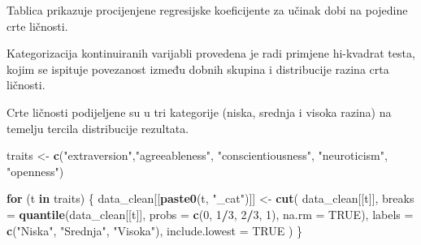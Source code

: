 \documentclass[
]{article}
\newenvironment{Shaded}{\begin{snugshade}}{\end{snugshade}}
\newcommand{\AttributeTok}[1]{\textcolor[rgb]{0.13,0.29,0.53}{#1}}
\newcommand{\ConstantTok}[1]{\textcolor[rgb]{0.56,0.35,0.01}{#1}}
\newcommand{\ControlFlowTok}[1]{\textcolor[rgb]{0.13,0.29,0.53}{\textbf{#1}}}
\newcommand{\DecValTok}[1]{\textcolor[rgb]{0.00,0.00,0.81}{#1}}
\newcommand{\FunctionTok}[1]{\textcolor[rgb]{0.13,0.29,0.53}{\textbf{#1}}}
\newcommand{\NormalTok}[1]{#1}
\newcommand{\OtherTok}[1]{\textcolor[rgb]{0.56,0.35,0.01}{#1}}
\newcommand{\SpecialCharTok}[1]{\textcolor[rgb]{0.81,0.36,0.00}{\textbf{#1}}}
\newcommand{\StringTok}[1]{\textcolor[rgb]{0.31,0.60,0.02}{#1}}
\begin{document}
Tablica prikazuje procijenjene regresijske koeficijente za učinak dobi
na pojedine crte ličnosti.

Kategorizacija kontinuiranih varijabli provedena je radi primjene
hi-kvadrat testa, kojim se ispituje povezanost između dobnih skupina i
distribucije razina crta ličnosti.

\begin{Shaded}
\end{Shaded}

Crte ličnosti podijeljene su u tri kategorije (niska, srednja i visoka
razina) na temelju tercila distribucije rezultata.

\begin{Shaded}
\begin{Highlighting}[]
\NormalTok{traits }\OtherTok{\textless{}{-}} \FunctionTok{c}\NormalTok{(}\StringTok{"extraversion"}\NormalTok{,}\StringTok{"agreeableness"}\NormalTok{, }\StringTok{"conscientiousness"}\NormalTok{, }\StringTok{"neuroticism"}\NormalTok{, }\StringTok{"openness"}\NormalTok{)}

\ControlFlowTok{for}\NormalTok{ (t }\ControlFlowTok{in}\NormalTok{ traits) \{}
\NormalTok{  data\_clean[[}\FunctionTok{paste0}\NormalTok{(t, }\StringTok{"\_cat"}\NormalTok{)]] }\OtherTok{\textless{}{-}} \FunctionTok{cut}\NormalTok{(}
\NormalTok{    data\_clean[[t]],}
    \AttributeTok{breaks =} \FunctionTok{quantile}\NormalTok{(data\_clean[[t]], }\AttributeTok{probs =} \FunctionTok{c}\NormalTok{(}\DecValTok{0}\NormalTok{, }\DecValTok{1}\SpecialCharTok{/}\DecValTok{3}\NormalTok{, }\DecValTok{2}\SpecialCharTok{/}\DecValTok{3}\NormalTok{, }\DecValTok{1}\NormalTok{), }\AttributeTok{na.rm =} \ConstantTok{TRUE}\NormalTok{),}
    \AttributeTok{labels =} \FunctionTok{c}\NormalTok{(}\StringTok{"Niska"}\NormalTok{, }\StringTok{"Srednja"}\NormalTok{, }\StringTok{"Visoka"}\NormalTok{),}
    \AttributeTok{include.lowest =} \ConstantTok{TRUE}
\NormalTok{  )}
\NormalTok{\}}
\end{Highlighting}
\end{Shaded}
\end{document}
